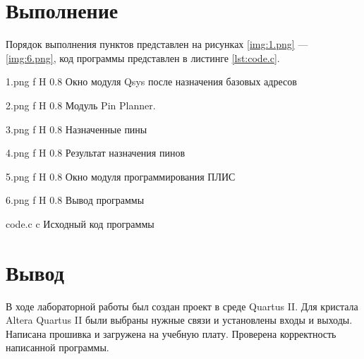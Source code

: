 \documentclass{bmstu}
\begin{document}
\section*{Выполнение}
Порядок выполнения пунктов представлен на рисунках \ref{img:1.png} --- \ref{img:6.png}, код программы представлен в листинге \ref{lst:code.c}.

    {1.png} %
    {f} %
    {H} %
    {0.8\textwidth} %
    {Окно модуля Qsys после назначения базовых адресов} %

    {2.png} %
    {f} %
    {H} %
    {0.8\textwidth} %
    {Модуль Pin Planner.} %

    {3.png} %
    {f} %
    {H} %
    {0.8\textwidth} %
    {Назначенные пины} %

    {4.png} %
    {f} %
    {H} %
    {0.8\textwidth} %
    {Результат назначения пинов} %

    {5.png} %
    {f} %
    {H} %
    {0.8\textwidth} %
    {Окно модуля программирования ПЛИС} %

    {6.png} %
    {f} %
    {H} %
    {0.8\textwidth} %
    {Вывод программы} %
    
\newpage
{}
    {code.c} %
    {c} %
    {Исходный код программы} %


\section*{Вывод}
В ходе лабораторной работы был создан проект в среде Quartus II. Для кристала Altera Quartus II были выбраны нужные связи и установлены входы и выходы. Написана прошивка и загружена на учебную плату. Проверена корректность написанной программы.
\end{document}
